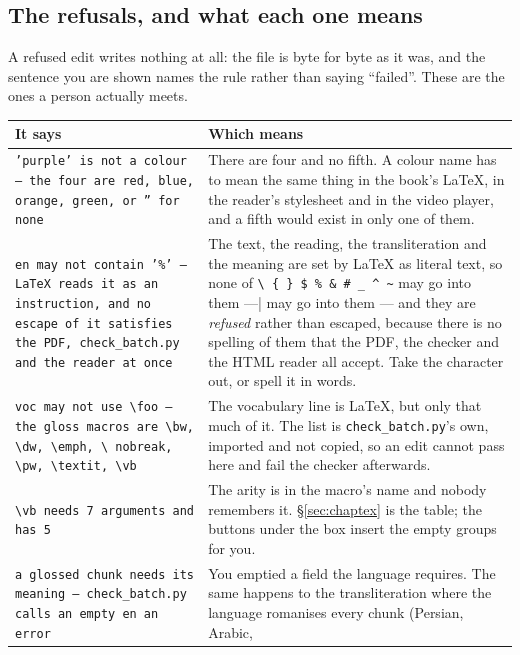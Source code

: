\documentclass[11pt,oneside]{report}
\newcommand{\file}[1]{\texttt{#1}}
\begin{document}
\subsection*{The refusals, and what each one means}

A refused edit writes nothing at all: the file is byte for byte as it was, and
the sentence you are shown names the rule rather than saying ``failed''. These
are the ones a person actually meets.

\begin{center}
\begin{longtable}{@{}p{}p{}@{}}
\toprule
\textsf{It says} & \textsf{Which means} \\
\midrule
\texttt{'purple' is not a colour --- the four are red, blue, orange, green, or
'' for none} &
  There are four and no fifth. A colour name has to mean the same thing in
  the book's LaTeX, in the reader's stylesheet and in the video player, and a
  fifth would exist in only one of them. \\
\addlinespace
\texttt{en may not contain '\%' --- LaTeX reads it as an instruction, and no
escape of it satisfies the PDF, check\_batch.py and the reader at once} &
  The text, the reading, the transliteration and the meaning are set by LaTeX
  as literal text, so none of \verb|\ { } $ % & # _ ^ ~| may go into them ---
  and they are \emph{refused} rather than escaped, because there is no
  spelling of them that the PDF, the checker and the HTML reader all accept.
  Take the character out, or spell it in words. \\
\addlinespace
\texttt{voc may not use \textbackslash foo --- the gloss macros are
\textbackslash bw, \textbackslash dw, \textbackslash emph, \textbackslash
nobreak, \textbackslash pw, \textbackslash textit, \textbackslash vb} &
  The vocabulary line is LaTeX, but only that much of it. The list is
  \file{check\_batch.py}'s own, imported and not copied, so an edit cannot
  pass here and fail the checker afterwards. \\
\addlinespace
\texttt{\textbackslash vb needs 7 arguments and has 5} &
  The arity is in the macro's name and nobody remembers it.
  \S\ref{sec:chaptex} is the table; the buttons under the box insert the
  empty groups for you. \\
\addlinespace
\texttt{a glossed chunk needs its meaning --- check\_batch.py calls an empty
en an error} &
  You emptied a field the language requires. The same happens to the
  transliteration where the language romanises every chunk (Persian, Arabic,

\end{longtable}
\end{center}
\end{document}
